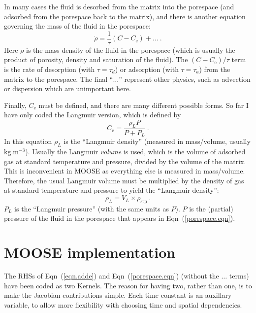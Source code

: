 \documentclass[]{scrreprt}
\begin{document}
In many cases the fluid is desorbed from the matrix into the porespace
(and adsorbed from the porespace back to the matrix), and there is
another equation governing the mass of the fluid in the porespace:
\begin{equation}
\dot{\rho} = \frac{1}{\tau}(C - C_{\mathrm{e}})
+ \ldots\ .
\label{porespace.eqn}
\end{equation}
Here $\rho$ is the mass density of the fluid in the porespace (which
is usually the product of porosity, density and saturation of the
fluid).  The $(C-C_{\mathrm{e}})/\tau$ term is the rate of desorption
(with $\tau=\tau_{d}$) or adsorption (with $\tau=\tau_{a}$)
from the matrix to the porespace.  The final ``$\ldots$'' represent
other physics, such as advection or dispersion which are unimportant
here.

Finally, $C_{\mathrm{e}}$ must be defined, and there are many
different possible forms.  So far I have only coded the Langmuir
version, which is defined by
\begin{equation}
C_{\mathrm{e}} = \frac{\rho_{L}P}{P+P_{L}} \ .
\label{langmuir.ce}
\end{equation}
In this equation $\rho_{L}$ is the ``Langmuir density'' (measured in
mass/volume, usually kg.m$^{-3}$).  Usually the Langmuir {\em volume}
is used, which is the volume of adsorbed gas at standard temperature
and pressure, divided by the volume of the matrix.  This is
inconvenient in MOOSE as everything else is measured in mass/volume.
Therefore, the usual Langmuir volume must be multiplied by the density
of gas at standard temperature and pressure to yield the ``Langmuir
density'':
\begin{equation}
\rho_{L} = V_{L}\times \rho_{\mathrm{stp}} \ .
\end{equation}
$P_{L}$ is the ``Langmuir pressure'' (with
the same units as $P$).  $P$ is the (partial) pressure of the fluid in
the porespace that appears in Eqn~(\ref{porespace.eqn}).



\chapter{MOOSE implementation}

The RHSs of Eqn~(\ref{eqn.adde}) and Eqn~(\ref{porespace.eqn}) (without
the $\ldots$ terms) have been coded as two Kernels.  The reason for
having two, rather than one, is to make the Jacobian contributions
simple.  Each time constant is an auxillary variable, to allow more
flexibility with choosing time and spatial dependencies.
\end{document}
